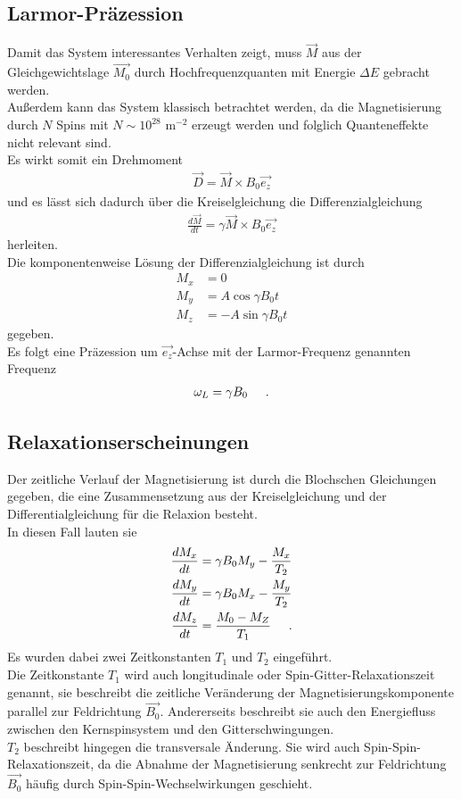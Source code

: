 \documentclass[]{scrartcl}
\begin{document}
\subsection{Larmor-Präzession}
Damit das System interessantes Verhalten zeigt, muss $\vec{M}$ aus der Gleichgewichtslage $\vec{M_0}$ durch Hochfrequenzquanten mit Energie $\Delta E$ gebracht werden.\\
Außerdem kann das System klassisch betrachtet werden, da die Magnetisierung durch $N$ Spins mit $N \sim 10^{28}$ m$^{-2}$ erzeugt werden und folglich Quanteneffekte nicht relevant sind.\\
Es wirkt somit ein Drehmoment
\begin{align}
\vec{D}=\vec{M}\times B_0 \vec{e_z}
\end{align}
und es lässt sich dadurch über die Kreiselgleichung die Differenzialgleichung
\begin{align}
\frac{d \vec{M}}{d t} = \gamma \vec{M}\times B_0 \vec{e_z}\label{eq::magzeit}
\end{align}
herleiten.\\
Die komponentenweise Lösung der Differenzialgleichung ist durch
\begin{align}
M_x&= 0 \\
M_y&= A \cos \gamma B_0 t \\
M_z&= -A \sin \gamma B_0 t
\end{align}
gegeben.\\
Es folgt eine Präzession um $\vec{e_z}$-Achse mit der Larmor-Frequenz genannten Frequenz
\begin{align}
\omega_L =\gamma B_0 \hspace*{0.5cm}\text{.}
\end{align}
\subsection{Relaxationserscheinungen}
Der zeitliche Verlauf der Magnetisierung ist durch die Blochschen Gleichungen gegeben, die eine Zusammensetzung aus der Kreiselgleichung und der Differentialgleichung für die Relaxion besteht.\\
In diesen Fall lauten sie
\begin{align}
\frac{d M_x}{d t}&= \gamma B_0 M_y - \frac{M_x}{T_2}\label{eq::bloch1}\\
\frac{d M_y}{d t}&= \gamma B_0 M_x - \frac{M_y}{T_2}\label{eq::bloch2}\\
\frac{d M_z}{d t}&= \frac{M_0-M_Z}{T_1}\hspace*{0.5cm}\text{.}\label{eq::bloch3}
\end{align}
Es wurden dabei zwei Zeitkonstanten $T_1$ und $T_2$ eingeführt.\\
Die Zeitkonstante $T_1$ wird auch longitudinale oder Spin-Gitter-Relaxationszeit genannt, sie beschreibt die zeitliche Veränderung der Magnetisierungskomponente parallel zur Feldrichtung $\vec{B_0}$. Andererseits beschreibt sie auch den Energiefluss zwischen den Kernspinsystem und den Gitterschwingungen.\\
$T_2$ beschreibt hingegen die transversale Änderung. Sie wird auch Spin-Spin-Relaxationszeit, da die Abnahme der Magnetisierung senkrecht zur Feldrichtung $\vec{B_0}$ häufig durch Spin-Spin-Wechselwirkungen geschieht.
\end{document}
